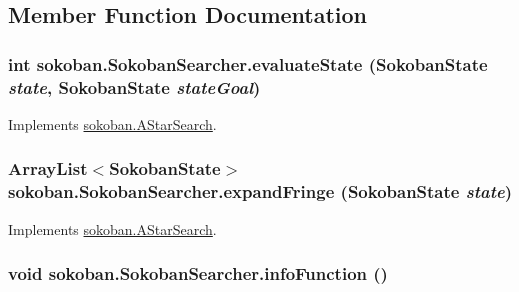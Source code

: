 \subsection{Member Function Documentation}
\hypertarget{classsokoban_1_1SokobanSearcher_897cc65b82be53f807b06a71a822a107}{
\subsubsection[{evaluateState}]{\setlength{\rightskip}{0pt plus 5cm}int sokoban.SokobanSearcher.evaluateState ({\bf SokobanState} {\em state}, \/  {\bf SokobanState} {\em stateGoal})}}
\label{classsokoban_1_1SokobanSearcher_897cc65b82be53f807b06a71a822a107}




Implements \hyperlink{classsokoban_1_1AStarSearch_7f5d111fd7504dc6d47dece202a26b6e}{sokoban.AStarSearch}.\hypertarget{classsokoban_1_1SokobanSearcher_fed3f74dd438abffdebe84a6a4d96e62}{
\subsubsection[{expandFringe}]{\setlength{\rightskip}{0pt plus 5cm}ArrayList$<${\bf SokobanState}$>$ sokoban.SokobanSearcher.expandFringe ({\bf SokobanState} {\em state})}}
\label{classsokoban_1_1SokobanSearcher_fed3f74dd438abffdebe84a6a4d96e62}




Implements \hyperlink{classsokoban_1_1AStarSearch_d898d53b9ed79238fca960bf6f453b7e}{sokoban.AStarSearch}.\hypertarget{classsokoban_1_1SokobanSearcher_d180c4da1ca3b7099d1e820843c619d0}{
\subsubsection[{infoFunction}]{\setlength{\rightskip}{0pt plus 5cm}void sokoban.SokobanSearcher.infoFunction ()}}
\label{classsokoban_1_1SokobanSearcher_d180c4da1ca3b7099d1e820843c619d0}




